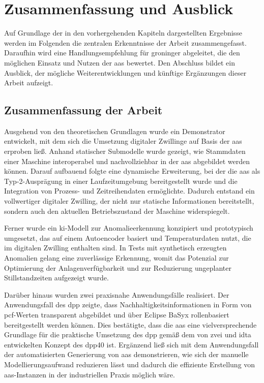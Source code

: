 \newpage
\section{Zusammenfassung und Ausblick}
\label{sec:Zusammenfassung}

Auf Grundlage der in den vorhergehenden Kapiteln dargestellten Ergebnisse werden im Folgenden die zentralen Erkenntnisse der Arbeit zusammengefasst. 
Daraufhin wird eine Handlungsempfehlung für groninger abgeleitet, die den möglichen Einsatz und Nutzen der \acs{aas} bewertet. 
Den Abschluss bildet ein Ausblick, der mögliche Weiterentwicklungen und künftige Ergänzungen dieser Arbeit aufzeigt.

\subsection{Zusammenfassung der Arbeit}

Ausgehend von den theoretischen Grundlagen wurde ein Demonstrator entwickelt, mit dem sich die Umsetzung digitaler Zwillinge auf Basis der \acs{aas} erproben ließ.
Anhand statischer Submodelle wurde gezeigt, wie Stammdaten einer Maschine interoperabel und nachvollziehbar in der \acs{aas} abgebildet werden können.
Darauf aufbauend folgte eine dynamische Erweiterung, bei der die \acs{aas} als Typ-2-Ausprägung in einer Laufzeitumgebung bereitgestellt wurde und die Integration von Prozess- und Zeitreihendaten ermöglichte.
Dadurch entstand ein vollwertiger digitaler Zwilling, der nicht nur statische Informationen bereitstellt, sondern auch den aktuellen Betriebszustand der Maschine widerspiegelt.

Ferner wurde ein \acs{ki}-Modell zur Anomalieerkennung konzipiert und prototypisch umgesetzt, das auf einem Autoencoder basiert und Temperaturdaten nutzt, die im digitalen Zwilling enthalten sind.
In Tests mit synthetisch erzeugten Anomalien gelang eine zuverlässige Erkennung, womit das Potenzial zur Optimierung der Anlagenverfügbarkeit und zur Reduzierung ungeplanter Stillstandzeiten aufgezeigt wurde.

Darüber hinaus wurden zwei praxisnahe Anwendungsfälle realisiert.
Der Anwendungsfall des \acs{dpp} zeigte, dass Nachhaltigkeitsinformationen in Form von \acs{pcf}-Werten transparent abgebildet und über Eclipse BaSyx rollenbasiert bereitgestellt werden können.
Dies bestätigte, dass die \acs{aas} eine vielversprechende Grundlage für die praktische Umsetzung des \acs{dpp} gemäß dem von \acs{zvei} und \acs{idta} entwickelten Konzept des \acs{dpp40} ist.
Ergänzend ließ sich mit dem Anwendungsfall der automatisierten Generierung von \acs{aas} demonstrieren, wie sich der manuelle Modellierungsaufwand reduzieren lässt und dadurch die effiziente Erstellung von \acs{aas}-Instanzen in der industriellen Praxis möglich wäre.

